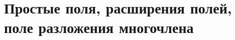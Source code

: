 \documentclass[../main/document.tex]{subfiles}
\begin{document}
\section{Простые поля, расширения полей, поле разложения многочлена}
\end{document}
